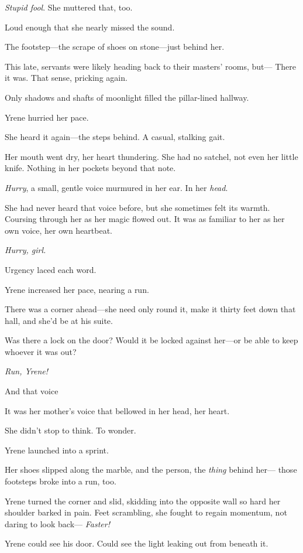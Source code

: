 \emph{Stupid fool}. She muttered that, too.

Loud enough that she nearly missed the sound.

The footstep---the scrape of shoes on stone---just behind her.

This late, servants were likely heading back to their masters' rooms, but--- There it was. That sense, pricking again.

Only shadows and shafts of moonlight filled the pillar-lined hallway.

Yrene hurried her pace.

She heard it again---the steps behind. A casual, stalking gait.

Her mouth went dry, her heart thundering. She had no satchel, not even her little knife. Nothing in her pockets beyond that note.

\emph{Hurry}, a small, gentle voice murmured in her ear. In her
\emph{head}.

She had never heard that voice before, but she sometimes felt its warmth. Coursing through her as her magic flowed out. It was as familiar to her as her own voice, her own heartbeat.

\emph{Hurry, girl.}

Urgency laced each word.

Yrene increased her pace, nearing a run.

There was a corner ahead---she need only round it, make it thirty feet down that hall, and she'd be at his suite.

Was there a lock on the door? Would it be locked against her---or be able to keep whoever it was out?

\emph{Run, Yrene!}

And that voice 

It was her mother's voice that bellowed in her head, her heart.

She didn't stop to think. To wonder.

Yrene launched into a sprint.

Her shoes slipped along the marble, and the person, the \emph{thing}
behind her--- those footsteps broke into a run, too.

Yrene turned the corner and slid, skidding into the opposite wall so hard her shoulder barked in pain. Feet scrambling, she fought to regain momentum, not daring to look back--- \emph{Faster!}

Yrene could see his door. Could see the light leaking out from beneath it.

